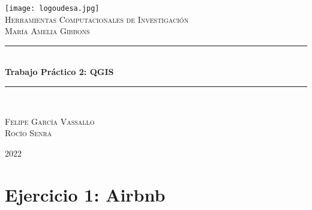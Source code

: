 \documentclass[11pt]{article}
\begin{document}
\begin{titlepage} %
	\newcommand{\HRule}{\rule{\linewidth}{0.5mm}} %
	
	\center %
	
	\texttt{[image: logoudesa.jpg]}\\[0.8cm]
	
	\textsc{\LARGE Herramientas Computacionales de Investigación}\\[0.5cm] %
	
	\textsc{\Large María Amelia Gibbons}\\
	\vspace{4pt}
	\textcolor{white}{\HRule}\\[0.6cm]
	\huge\bfseries Trabajo Práctico 2: QGIS 
	\textcolor{white}{\HRule}\\[1.5cm]
	\begin{center}
		\Large
		\textsc{Felipe García Vassallo\\
		        Rocío Senra}\\
	\end{center}
	
	
	\vfill\vfill\vfill %
	{\large 2022}
	\vfill
	
\end{titlepage}

\section*{Ejercicio 1: Airbnb} 
\end{document}
